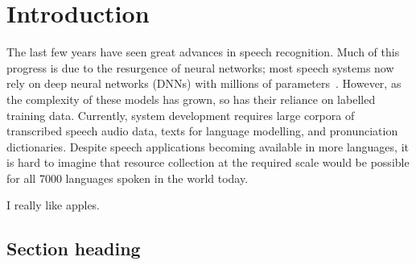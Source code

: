 \graphicspath{{introduction/fig/}}

\chapter{Introduction}
\label{chap:introduction}

The last few years have seen great advances in speech recognition. Much of this progress is due to the resurgence of neural networks; most speech systems now rely on deep neural networks (DNNs) with millions of parameters~\cite{dahl+etal_taslp12,hinton+etal_spm2012}.
However, as the complexity of these models has grown, so has their reliance on labelled training data. Currently, system development requires large corpora of transcribed speech audio data, texts for language modelling, and pronunciation dictionaries.
Despite speech applications becoming available in more languages, it is hard to imagine that resource collection at the required scale would be possible for all 7000 languages spoken in the world today.

I really like apples.

\section{Section heading}

